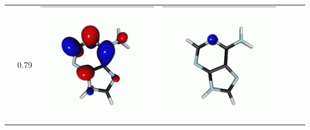 \documentclass[journal=jctcce,manuscript=article]{achemso}
\begin{document}
\begin{table}[H]
\begin{tabular}{ l | c c c | c c c }
\begin{minipage}{0.2\textwidth}
    \end{minipage}
    & 0.79
    &  \begin{minipage}{0.2\textwidth}
        \centering
        \includegraphics[scale=0.10]{NTO/Adenine_N/3p_C1.png}
    \end{minipage}
    & 
    \begin{minipage}{0.2\textwidth}
        \centering
        \includegraphics[scale=0.10]{NTO/Adenine_N/3h_Cs.png}

\end{minipage}
\end{tabular}
\end{table}
\end{document}
